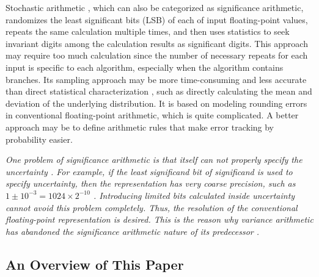 \documentclass[twoside]{article}
\numberwithin{equation}{section}
\begin{document}
Stochastic arithmetic \cite{Stochastic_Arithmetic} \cite{CADNA_library}, which can also be categorized as significance arithmetic, randomizes the least significant bits (LSB) of each of input floating-point values, repeats the same calculation multiple times, and then uses statistics to seek invariant digits among the calculation results as significant digits.  
This approach may require too much calculation since the number of necessary repeats for each input is specific to each algorithm, especially when the algorithm contains branches.  
Its sampling approach may be more time-consuming and less accurate than direct statistical characterization \cite{Probability_Statistics}, such as directly calculating the mean and deviation of the underlying distribution.  
It is based on modeling rounding errors in conventional floating-point arithmetic, which is quite complicated.  
A better approach may be to define arithmetic rules that make error tracking by probability easier.

\emph{
One problem of significance arithmetic is that itself can not properly specify the uncertainty \cite{Prev_Precision_Arithmetic}.
For example, if the least significand bit of significand is used to specify uncertainty, then the representation has very coarse precision, such as $1 \pm 10^{-3} = 1024 \times 2^{-10}$  \cite{Prev_Precision_Arithmetic}.
Introducing limited bits calculated inside uncertainty cannot avoid this problem completely.
Thus, the resolution of the conventional floating-point representation is desired.
This is the reason why variance arithmetic has abandoned the significance arithmetic nature of its predecessor \cite{Prev_Precision_Arithmetic}.
}



\subsection{ An Overview of This Paper}
\end{document}
